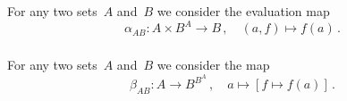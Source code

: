 \subsection{}



\subsubsection{}

For any two sets~$A$ and~$B$ we consider the evaluation map
\[
	α_{AB}
	\colon
	A × B^A \to B \,,
	\quad
	(a, f) \mapsto f(a) \,.
\]



\subsubsection{}

For any two sets~$A$ and~$B$ we consider the map
\[
	β_{AB}
	\colon
	A \to B^{B^A} \,,
	\quad
	a \mapsto [f \mapsto f(a)] \,.
\]
